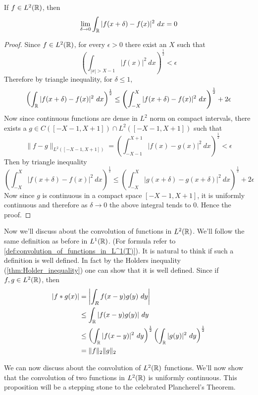 \begin{proposition}
  \label{prop:L2_functions_are_continuous_in_L2_norm_in_R}
  If $f\in L^2(\mathbb R)$, then $$\lim_{\delta \to 0} \int_\mathbb R |f(x+\delta) - f(x)|^2 \ dx = 0 $$
\end{proposition}
\begin{proof}
  Since $f\in L^2(\mathbb R)$, for every $\epsilon > 0$ there exist an $X$ such that $$\left( \int_{|x|> X-1} |f(x)|^2 \ dx \right)^{\frac{1}{2}} < \epsilon$$
  Therefore by triangle inequality, for $\delta \le 1$, $$ \left( \int_\mathbb R |f(x+\delta) - f(x)|^2 \ dx \right)^{\frac{1}{2}} \le \left( \int_{-X}^X |f(x+\delta) - f(x)|^2 \ dx \right)^{\frac{1}{2}} + 2\epsilon$$
  Now since continuous functions are dense in $L^2$ norm on compact intervals, there exists a $g \in C([-X-1, X+1])\cap L^2([-X-1, X+1])$ such that $$ \|f-g\|_{L^2([-X-1, X+1])} = \left( \int_{-X-1}^{X+1} |f(x) - g(x)|^2 \ dx \right)^{\frac{1}{2}} < \epsilon $$
  Then by triangle inequality $$ \left( \int_{-X}^X |f(x+\delta) - f(x)|^2 \ dx \right)^{\frac{1}{2}} \le \left( \int_{-X}^X |g(x+\delta) - g(x+\delta)|^2 \ dx \right)^{\frac{1}{2}} + 2\epsilon $$
  Now since $g$ is continuous in a compact space $[-X-1, X+1]$, it is uniformly continuous and therefore as $\delta \to 0$ the above integral tends to $0$. Hence the proof.
\end{proof}

Now we'll discuss about the convolution of functions in $L^2(\mathbb R)$. We'll follow the same definition as before in $L^1(\mathbb R)$. (For formula refer to \autoref{def:convolution_of_functions_in_L^1(T)}). It is natural to think if such a definition is well defined. In fact by the Holders inequality (\autoref{thm:Holder_inequality}) one can show that it is well defined. Since if $f, g \in L^2(\mathbb R)$, then 
  \begin{align*}
    |f*g(x)| &= \left|\int_R f(x-y)g(y) \ dy \right|\\
        &\le \int_\mathbb R |f(x-y)g(y)| \ dy \\
        &\le \left(\int_\mathbb R |f(x-y)|^2 \ dy \right)^{\frac{1}{2}} \left(\int_\mathbb R |g(y)|^2 \ dy \right)^{\frac{1}{2}} \\
        &= \|f\|_2 \|g\|_2
  \end{align*}

We can now discuss about the convolution of $L^2(\mathbb R)$ functions. We'll now show that the convolution of two functions in $L^2(\mathbb R)$ is uniformly continuous. This proposition will be a stepping stone to the celebrated Plancherel's Theorem.


